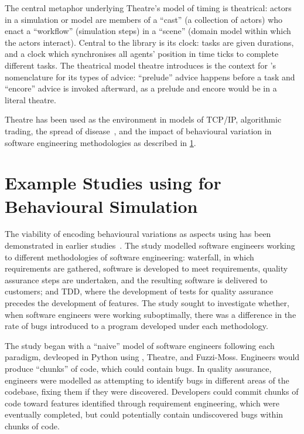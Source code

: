 The central metaphor underlying Theatre's model of timing is theatrical: actors
in a simulation or model are members of a ``cast'' (a collection of actors) who
enact a ``workflow'' (simulation steps) in a ``scene'' (domain model within
which the actors interact). Central to the library is its clock: tasks are given
durations, and a clock which synchronises all agents' position in time ticks to
complete different tasks. The theatrical model theatre introduces is the context
for \pdsf{}'s nomenclature for its types of advice: ``prelude'' advice happens
before a task and ``encore'' advice is invoked afterward, as a prelude and
encore would be in a literal theatre.

Theatre has been used as the environment in models of TCP/IP, algorithmic
trading, the spread of disease~\cite{aranTheatreThesis}, and the impact of
behavioural variation in software engineering methodologies as described in
\cref{sec:caise_paper}.


\section{Example Studies using \pdsf for Behavioural Simulation}\label{sec:caise_paper}

The viability of encoding behavioural variations as aspects using \pdsf has been
demonstrated in earlier studies~\cite{wallis2018caise,aranTheatreThesis}.
 The study modelled software engineers working to
different methodologies of software engineering: waterfall, in which
requirements are gathered, software is developed to meet requirements, quality
assurance steps are undertaken, and the resulting software is delivered to
customers; and TDD, where the development of tests for quality assurance
precedes the development of features. The study sought to investigate whether,
when software engineers were working suboptimally, there was a difference in the
rate of bugs introduced to a program developed under each methodology.

The study began with a ``naive'' model of software engineers following each
paradigm, devleoped in Python using \pdsf, Theatre, and Fuzzi-Moss. Engineers
would produce ``chunks'' of code, which could contain bugs. In quality
assurance, engineers were modelled as attempting to identify bugs in different
areas of the codebase, fixing them if they were discovered. Developers could
commit chunks of code toward features identified through requirement
engineering, which were eventually completed, but could potentially contain
undiscovered bugs within chunks of code.

